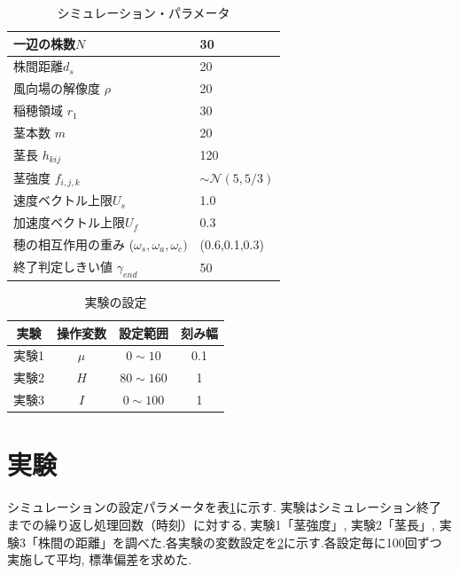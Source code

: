 \documentclass[twocolumn]{jarticle}
\begin{document}
        \begin{table}[b]
            \begin{tabular}{||l|l||}
                \hline
                一辺の株数$N$ & 30 \\  \hline
                株間距離$d_s$ &20 \\ \hline
                風向場の解像度 $\rho$&20 \\ \hline
                稲穂領域 $r_1$ & 30 \\ \hline
                茎本数  $m$& 20 \\ \hline
                茎長 $h_{kij}$& 120 \\\hline
                茎強度 $f_{i,j,k}$ &$\sim \mathcal{N}( 5, 5/3)$\\\hline
                速度ベクトル上限$U_{s}$&1.0\\\hline
                加速度ベクトル上限$U_f$&0.3 \\ \hline
                穂の相互作用の重み ($\omega_s,\omega_a,\omega_c)$&(0.6,0.1,0.3) \\ 
                \hline
                終了判定しきい値  $\gamma_{end}$&50 \\\hline
            \end{tabular}
            \caption{シミュレーション・パラメータ}
            \label{table:standards}
        \end{table}
        \begin{table}[bt]        
            \begin{tabular}{|c|c|c|c|}
                \hline
                実験 & 操作変数 & 設定範囲 & 刻み幅 \\
                \hline
                実験1 & $\mu$ & $0\sim10$ & 0.1 \\
                \hline
                実験2 & $H$ & $80\sim160$ & 1 \\
                \hline
                実験3 & $I$ & $0\sim100$ & 1 \\
                \hline
            \end{tabular}  
            \caption{実験の設定} 
            \label{table:jikken}
        \end{table}


\section{実験}
シミュレーションの設定パラメータを表\ref{table:standards}に示す. 
実験はシミュレーション終了までの繰り返し処理回数（時刻）に対する, 実験1「茎強度」, 実験2「茎長」, 実験3「株間の距離」を調べた.各実験の変数設定を\ref{table:jikken}に示す.各設定毎に100回ずつ実施して平均, 標準偏差を求めた.
\end{document}
